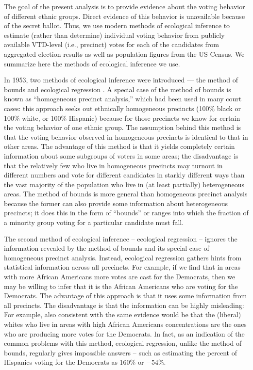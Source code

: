 \documentclass[12pt]{article}
\begin{document}
The goal of the present analysis is to provide evidence about the
voting behavior of different ethnic groups. Direct evidence of this
behavior is unavailable because of the secret ballot. Thus, we use
modern methods of ecological inference to estimate (rather than
determine) individual voting behavior from publicly available
VTD-level (i.e., precinct) votes for each of the candidates from
aggregated election results as well as population figures from the US
Census.  We summarize here the methods of ecological inference we use.

In 1953, two methods of ecological inference were introduced --- the
method of bounds \citep{DunDav53} and ecological regression
\citep{Goodman53}. A special case of the method of bounds is known
as ``homogeneous precinct analysis,'' which had been used in many
court cases: this approach seeks out ethnically homogeneous precincts
(100\% black or 100\% white, or 100\% Hispanic) because for those
precincts we know for certain the voting behavior of one ethnic group.
The assumption behind this method is that the voting behavior observed
in homogeneous precincts is identical to that in other areas. The
advantage of this method is that it yields completely certain
information about some subgroups of voters in some areas; the
disadvantage is that the relatively few who live in homogeneous
precincts may turnout in different numbers and vote for different
candidates in starkly different ways than the vast majority of the
population who live in (at least partially) heterogeneous areas.  The
method of bounds is more general than homogeneous precinct analysis
because the former can also provide some information about
heterogeneous precincts; it does this in the form of ``bounds'' or
ranges into which the fraction of a minority group voting for a
particular candidate must fall.

The second method of ecological inference -- ecological regression --
ignores the information revealed by the method of bounds and its
special case of homogeneous precinct analysis. Instead, ecological
regression gathers hints from statistical information across all
precincts. For example, if we find that in areas with more African
Americans more votes are cast for the Democrats, then we may be
willing to infer that it is the African Americans who are voting for
the Democrats. The advantage of this approach is that it uses some
information from all precincts. The disadvantage is that the
information can be highly misleading: For example, also consistent
with the same evidence would be that the (liberal) whites who live in
areas with high African Americans concentrations are the ones who are
producing more votes for the Democrats. In fact, as an indication of
the common problems with this method, ecological regression, unlike
the method of bounds, regularly gives impossible answers -- such as
estimating the percent of Hispanics voting for the Democrats as 160\%
or $-54$\%.
\end{document}
